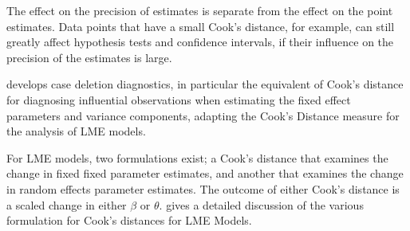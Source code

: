 \documentclass[12pt, a4paper]{report}
\theoremstyle{definition}
\theoremstyle{remark}
\begin{document}
The effect on the precision of estimates is separate from the effect on the point estimates. Data points that have a small Cook's distance, for example, can still greatly affect hypothesis tests and confidence intervals, if their  influence on the precision of the estimates is large.

\citet{Christensen} develops  case deletion diagnostics, in particular the equivalent of  Cook's distance for diagnosing influential observations when estimating the fixed effect parameters and variance components, adapting the Cook's Distance measure for the analysis of LME models. 

For LME models, two formulations exist; a Cook's distance that examines the change in fixed fixed parameter estimates, and another that examines the change in random effects parameter estimates. The outcome of either Cook's distance is a scaled change in either $\beta$ or $\theta$. \citet{Zewotir} gives a detailed discussion of the various formulation for Cook's distances for LME Models.


%


\end{document}
